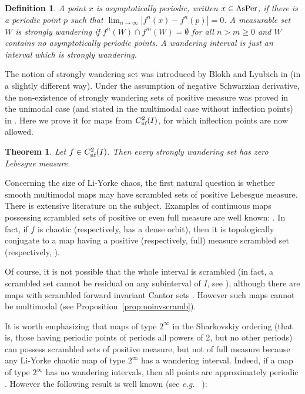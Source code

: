 \documentclass[12pt, psamsfonts, reqno]{amsart}
\newcounter{letter}
\newtheorem{maintheorem}[letter]{Theorem}
\newtheorem{definition}[theorem]{Definition}
\begin{document}
\begin{definition}\label{def:wandering}
A point $x$ is \emph{asymptotically periodic}, written $x\in {\mathop{\rm AsPer}\nolimits}$,
if there is a periodic point $p$ such that
$\lim_{n\to \infty} |f^n(x)-f^n(p)|=0$.
A measurable set $W$ is \emph{strongly wandering} if
$f^n(W) \cap f^m(W) = \emptyset$ for all $n > m \geq 0$ and $W$
contains no asymptotically periodic points.
A \emph{wandering interval} is just an interval which is strongly wandering.
\end{definition}

The notion of strongly wandering set was introduced by Blokh and
Lyubich in \cite{BL} (in a slightly different way). Under the
assumption of negative Schwarzian derivative, the non-existence of
strongly wandering sets of positive measure was proved in the
unimodal case (and stated in the multimodal case without
inflection points) in \cite{BL}. Here we prove it for maps from
${C^2_{\text{\rm nf}}}(I)$, for which inflection points are now allowed.

\begin{maintheorem} \label{mainthm:Strong}
 Let $f\in {C^2_{\text{\rm nf}}}(I)$. Then every strongly wandering set
 has zero Lebesgue measure.
\end{maintheorem}

Concerning the size of Li-Yorke chaos, the first natural question
is whether smooth multimodal maps may have scrambled sets of
positive Lebesgue measure. There is extensive literature on the
subject. Examples of continuous maps possessing scrambled sets of
positive or even full measure are well known: \cite{Kan, Smi2,
Mis, BrHu}. In fact, if $f$ is chaotic (respectively, has a dense
orbit), then it is topologically conjugate to a map having a
positive (respectively, full) measure scrambled set \cite{JaSm,
Smi3} (respectively, \cite{SmSt}).

Of course, it is not possible that the whole interval is scrambled
(in fact, a scrambled set cannot be residual on any subinterval of
$I$, see \cite{Ged}), although there are maps  with scrambled
forward invariant Cantor sets \cite{HuYe}. However such maps
cannot be multimodal (see Proposition~\ref{prop:noinvscramb}).

It is worth emphasizing that maps of type $2^\infty$ in the
Sharkovskiy ordering (that is, those having periodic points of
periods all powers of 2, but no other periods) can possess
scrambled sets of positive measure, but not of full measure
because any Li-Yorke chaotic map of type $2^\infty$ has a wandering
interval. Indeed, if a map of type $2^\infty$ has no wandering
intervals, then all points are approximately periodic \cite{Smi3}.
However the following result is well known (see {{\em e.g.~}} \cite[p.
144]{BlCo}):
\end{document}
